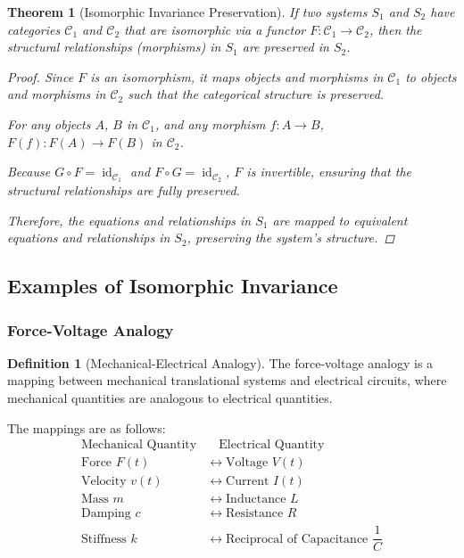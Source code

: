 \documentclass{article}
\newtheorem{theorem}{Theorem}[section]
\theoremstyle{definition}
\newtheorem{definition}{Definition}[section]
\theoremstyle{remark}
\begin{document}
	\begin{theorem}[Isomorphic Invariance Preservation]
		If two systems $S_1$ and $S_2$ have categories $\mathcal{C}_1$ and $\mathcal{C}_2$ that are isomorphic via a functor $F: \mathcal{C}_1 \rightarrow \mathcal{C}_2$, then the structural relationships (morphisms) in $S_1$ are preserved in $S_2$.
		
		\begin{proof}
			Since $F$ is an isomorphism, it maps objects and morphisms in $\mathcal{C}_1$ to objects and morphisms in $\mathcal{C}_2$ such that the categorical structure is preserved.
			
			For any objects $A$, $B$ in $\mathcal{C}_1$, and any morphism $f: A \rightarrow B$, $F(f): F(A) \rightarrow F(B)$ in $\mathcal{C}_2$.
			
			Because $G \circ F = \operatorname{id}_{\mathcal{C}_1}$ and $F \circ G = \operatorname{id}_{\mathcal{C}_2}$, $F$ is invertible, ensuring that the structural relationships are fully preserved.
			
			Therefore, the equations and relationships in $S_1$ are mapped to equivalent equations and relationships in $S_2$, preserving the system's structure.
		\end{proof}
	\end{theorem}
	
	\subsection{Examples of Isomorphic Invariance}
	
	\subsubsection{Force-Voltage Analogy}
	
	\begin{definition}[Mechanical-Electrical Analogy]
		The force-voltage analogy is a mapping between mechanical translational systems and electrical circuits, where mechanical quantities are analogous to electrical quantities.
		
		The mappings are as follows:
		\begin{align*}
			\text{Mechanical Quantity} &\quad \text{Electrical Quantity} \\
			\hline
			\text{Force } F(t) &\leftrightarrow \text{Voltage } V(t) \\
			\text{Velocity } v(t) &\leftrightarrow \text{Current } I(t) \\
			\text{Mass } m &\leftrightarrow \text{Inductance } L \\
			\text{Damping } c &\leftrightarrow \text{Resistance } R \\
			\text{Stiffness } k &\leftrightarrow \text{Reciprocal of Capacitance } \dfrac{1}{C}
		\end{align*}
	\end{definition}
	
\end{document}
